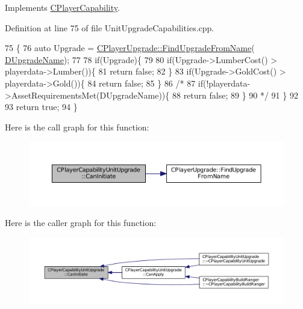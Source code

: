 Implements \hyperlink{classCPlayerCapability_aa83b1e1fcaff2985c378132d679154ea}{C\+Player\+Capability}.



Definition at line 75 of file Unit\+Upgrade\+Capabilities.\+cpp.


\begin{DoxyCode}
75                                                                                                            
                     \{
76     \textcolor{keyword}{auto} Upgrade = \hyperlink{classCPlayerUpgrade_af47a08aba3a1a5b2cefacef24065a82e}{CPlayerUpgrade::FindUpgradeFromName}(
      \hyperlink{classCPlayerCapabilityUnitUpgrade_a5de8bffd6935c699f431329ad4ee5eec}{DUpgradeName});
77     
78     \textcolor{keywordflow}{if}(Upgrade)\{
79 
80         \textcolor{keywordflow}{if}(Upgrade->LumberCost() > playerdata->Lumber())\{
81             \textcolor{keywordflow}{return} \textcolor{keyword}{false};   
82         \}
83         \textcolor{keywordflow}{if}(Upgrade->GoldCost() > playerdata->Gold())\{
84             \textcolor{keywordflow}{return} \textcolor{keyword}{false};   
85         \}
86         \textcolor{comment}{/*}
87 \textcolor{comment}{        if(!playerdata->AssetRequirementsMet(DUpgradeName))\{}
88 \textcolor{comment}{            return false;}
89 \textcolor{comment}{        \}}
90 \textcolor{comment}{        */}
91     \}
92     
93     \textcolor{keywordflow}{return} \textcolor{keyword}{true};
94 \}
\end{DoxyCode}
Here is the call graph for this function\+:
\nopagebreak
\begin{figure}[H]
\begin{center}
\leavevmode
\includegraphics[width=350pt]{classCPlayerCapabilityUnitUpgrade_ad01fc5df598efea4063ac2bbf0ba34e9_cgraph}
\end{center}
\end{figure}
Here is the caller graph for this function\+:
\nopagebreak
\begin{figure}[H]
\begin{center}
\leavevmode
\includegraphics[width=350pt]{classCPlayerCapabilityUnitUpgrade_ad01fc5df598efea4063ac2bbf0ba34e9_icgraph}
\end{center}
\end{figure}


